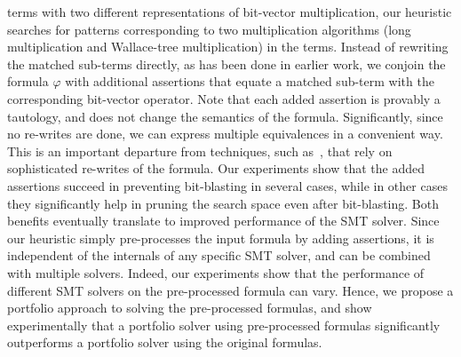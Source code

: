 terms with two different representations of bit-vector multiplication,
our heuristic searches for patterns corresponding to two
multiplication algorithms (long multiplication and Wallace-tree
multiplication) in the terms. Instead of rewriting the matched
sub-terms directly, as has been done in earlier work, we conjoin the
formula $\varphi$ with additional assertions that equate a matched
sub-term with the corresponding bit-vector operator.  Note that each
added assertion is provably a tautology, and does not change the
semantics of the formula.  Significantly, since no re-writes are done,
we can express multiple equivalences in a convenient way.  This is an
important departure from techniques, such as~\cite{kolbl}, that rely
on sophisticated re-writes of the formula. Our experiments show that
the added assertions succeed in preventing bit-blasting in several
cases, while in other cases they significantly help in pruning the
search space even after bit-blasting.  Both benefits eventually
translate to improved performance of the SMT solver.  Since our
heuristic simply pre-processes the input formula by adding assertions,
it is independent of the internals of any specific SMT solver, and can
be combined with multiple solvers.  Indeed, our experiments show that
the performance of different SMT solvers on the pre-processed formula
can vary.  Hence, we propose a portfolio approach to solving the
pre-processed formulas, and show experimentally that a portfolio
solver using pre-processed formulas significantly outperforms a
portfolio solver using the original formulas.



%
